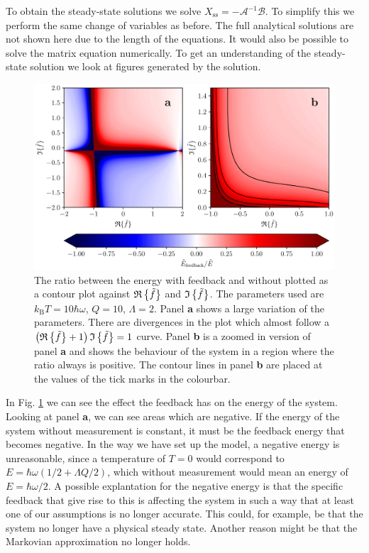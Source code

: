 To obtain the steady-state solutions we solve $X_\text{ss} = - \mathcal{A}^{-1} \mathcal{B}$. To simplify this we perform the same change of variables as before. The full analytical solutions are not shown here due to the length of the equations. It would also be possible to solve the matrix equation numerically. To get an understanding of the steady-state solution we look at figures generated by the solution.

\begin{figure}[t]
    \centering
    \includegraphics[width=\textwidth]{figures/energyFeedbackRatio.pdf}
    \caption{\small The ratio between the energy with feedback and without plotted as a contour plot against $\mathfrak{R}\left\{\tilde{f}\right\}$ and $\mathfrak{I}\left\{\tilde{f}\right\}$. The parameters used are $k_\text{B}T = 10 \hbar\omega$, $Q = 10$, $\Lambda = 2$. Panel \textbf{a} shows a large variation of the parameters. There are divergences in the plot which almost follow a $\left(\mathfrak{R}\left\{\tilde{f}\right\} + 1 \right)\mathfrak{I}\left\{\tilde{f}\right\} = 1$ curve. Panel \textbf{b} is a zoomed in version of panel \textbf{a} and shows the behaviour of the system in a region where the ratio always is positive. The contour lines in panel \textbf{b} are placed at the values of the tick marks in the colourbar.}
    \label{fig:energyFeedbackRatio}
\end{figure}
In Fig. \ref{fig:energyFeedbackRatio} we can see the effect the feedback has on the energy of the system. Looking at panel \textbf{a}, we can see areas which are negative. If the energy of the system without measurement is constant, it must be the feedback energy that becomes negative. In the way we have set up the model, a negative energy is unreasonable, since a temperature of $T=0$ would correspond to $E =\hbar\omega( 1/2 + \Lambda Q/2)$, which without measurement would mean an energy of $E = \hbar\omega/2$. A possible explantation for the negative energy is that the specific feedback that give rise to this is affecting the system in such a way that at least one of our assumptions is no longer accurate. This could, for example, be that the system no longer have a physical steady state. Another reason might be that the Markovian approximation no longer holds.

